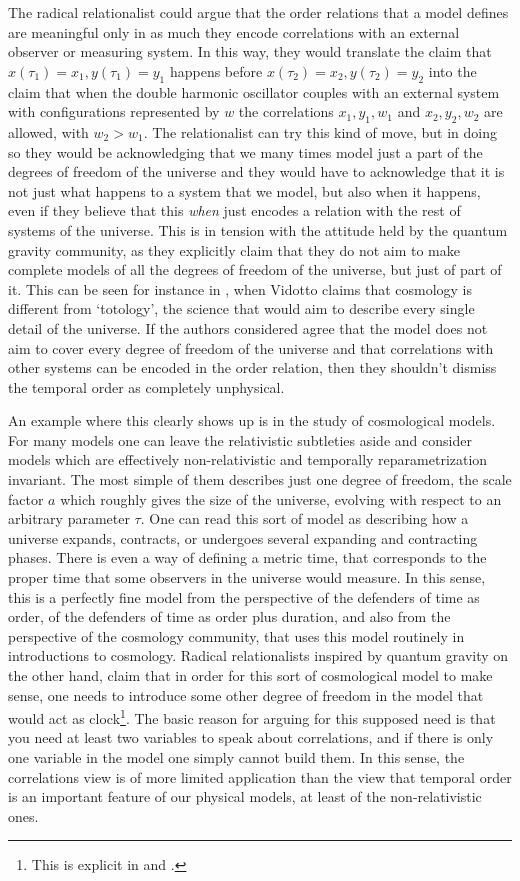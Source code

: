 \documentclass[12 pt]{article}
\begin{document}
The radical relationalist could argue that the order relations that a model defines are meaningful only in as much they encode correlations with an external observer or measuring system. In this way, they would translate the claim that $x(\tau_1)=x_1,y(\tau_1)=y_1$ happens before $x(\tau_2)=x_2,y(\tau_2)=y_2$ into the claim that when the double harmonic oscillator couples with an external system with configurations represented by $w$ the correlations $x_1,y_1,w_1$ and $x_2,y_2,w_2$ are allowed, with $w_2>w_1$. The relationalist can try this kind of move, but in doing so they would be acknowledging that we many times model just a part of the degrees of freedom of the universe and they would have to acknowledge that it is not just what happens to a system that we model, but also when it happens, even if they believe that this \textit{when} just encodes a relation with the rest of systems of the universe. This is in tension with the attitude held by the quantum gravity community, as they explicitly claim that they do not aim to make complete models of all the degrees of freedom of the universe, but just of part of it. This can be seen for instance in \citep{Vidotto2017}, when Vidotto claims that cosmology is different from `totology', the science that would aim to describe every single detail of the universe. If the authors considered agree that the model does not aim to cover every degree of freedom of the universe and that correlations with other systems can be encoded in the order relation, then they shouldn't dismiss the temporal order as completely unphysical.

An example where this clearly shows up is in the study of cosmological models. For many models one can leave the relativistic subtleties aside and consider models which are effectively non-relativistic and temporally reparametrization invariant. The most simple of them describes just one degree of freedom, the scale factor $a$ which roughly gives the size of the universe, evolving with respect to an arbitrary parameter $\tau$. One can read this sort of model as describing how a universe expands, contracts, or undergoes several expanding and contracting phases. There is even a way of defining a metric time, that corresponds to the proper time that some observers in the universe would measure. In this sense, this is a perfectly fine model from the perspective of the defenders of time as order, of the defenders of time as order plus duration, and also from the perspective of the cosmology community, that uses this model routinely in introductions to cosmology. Radical relationalists inspired by quantum gravity on the other hand, claim that in order for this sort of cosmological model to make sense, one needs to introduce some other degree of freedom in the model that would act as clock\footnote{This is explicit in \citep[Sect. 15.3.2]{Vidotto2017} and \citep{Marchetti2021}.}. The basic reason for arguing for this supposed need is that you need at least two variables to speak about correlations, and if there is only one variable in the model one simply cannot build them. In this sense, the correlations view is of more limited application than the view that temporal order is an important feature of our physical models, at least of the non-relativistic ones.
\end{document}

